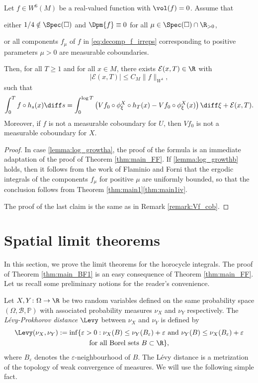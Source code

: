 \begin{lemma}\label{lemma:log_growth}
Let $f \in W^6(M)$ be a real-valued function with $\vol(f)=0$.
Assume that
\begin{enumeratea}
\item\label{lemma:log_growtha}
either $1/4 \notin \Spec(\square)$ and $\Dpm{f} \equiv 0$ for all $\mu \in \Spec(\square) \cap \R_{>0}$,
\item\label{lemma:log_growthb}
or all components $f_\mu$ of $f$ in \eqref{eq:decomp_f_irreps} corresponding to positive parameters $\mu >0$ are measurable coboundaries.
\end{enumeratea}
Then, for all $T \geq 1$ and for all $x \in M$, there exists $\mathcal{E}(x,T) \in \R$ with
\[
|\mathcal{E}(x,T) |\leq C_M \|f\|_{W^4},
\]
such that
\[
\int_0^T f \circ h_s(x) \diff s = \int_0^{\log T} \left(Vf_0 \circ \phi^X_{\xi}\circ h_T(x) - Vf_0\circ \phi^X_{\xi}(x) \right) \diff \xi + \mathcal{E}(x,T).
\]
Moreover, if $f$ is not a measurable coboundary for $U$, then $Vf_0$ is not a measurable coboundary for $X$.
\end{lemma}

\begin{proof}
In case \eqref{lemma:log_growtha}, the proof of the formula is an immediate adaptation of the proof of Theorem \ref{thm:main_FF}. If \eqref{lemma:log_growthb} holds, then it follows from the work of Flaminio and Forni that the ergodic integrals of the components $f_\mu$ for positive $\mu$ are uniformly bounded, so that the conclusion follows from Theorem \ref{thm:main1}\eqref{thm:main1iv}.

The proof of the last claim is the same as in Remark \ref{remark:Vf_cob}.
\end{proof}

\section{Spatial limit theorems}\label{sec:limit}

In this section, we prove the limit theorems for the horocycle integrals. The proof of Theorem \ref{thm:main_BF1} is an easy consequence of Theorem \ref{thm:main_FF}. Let us recall some preliminary notions for the reader's convenience.

Let $X,Y \colon \Omega \to \R$ be two random variables defined on the same probability space $(\Omega, \mathcal{B}, \mathbb{P})$ with associated probability measures $\nu_X$ and $\nu_Y$ respectively.
The \emph{Lévy-Prokhorov distance} $\Levy$ between $\nu_X$ and $\nu_Y$ is defined by
\begin{multline*}
\Levy(\nu_X, \nu_Y) := \inf \{\varepsilon > 0 : \nu_X(B) \leq \nu_Y(B_{\varepsilon}) + \varepsilon \text{\ and\ } \nu_Y(B) \leq \nu_X(B_{\varepsilon}) + \varepsilon \\
\text{for all Borel sets\ } B \subset \R\},
\end{multline*}
where $B_{\varepsilon}$ denotes the $\varepsilon$-neighbourhood of $B$.
The Lévy distance is a metrization of the topology of weak convergence of measures.
We will use the following simple fact.

